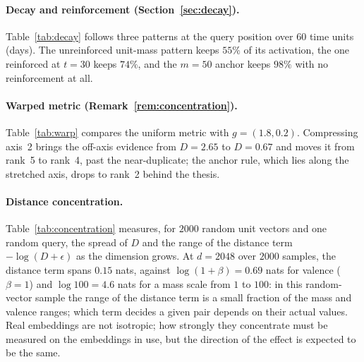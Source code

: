 \documentclass[11pt]{article}
\theoremstyle{remark}
\newcommand{\act}{E}
\begin{document}
\paragraph{Decay and reinforcement (Section~\ref{sec:decay}).}
Table~\ref{tab:decay} follows three patterns at the query position over $60$ time units (days). The unreinforced unit-mass pattern keeps $55\%$ of its activation, the one reinforced at $t=30$ keeps $74\%$, and the $m=50$ anchor keeps $98\%$ with no reinforcement at all.

\begin{table}[htbp]
  \centering
  \caption{Decay over $60$ time units (days) with $\lambda_0=0.02\text{ days}^{-1}$, $m_\ast=1$.}
  \label{tab:decay}
  
\end{table}

\paragraph{Warped metric (Remark~\ref{rem:concentration}).}
Table~\ref{tab:warp} compares the uniform metric with $g=(1.8,0.2)$. Compressing axis~2 brings the off-axis evidence from $D=2.65$ to $D=0.67$ and moves it from rank~5 to rank~4, past the near-duplicate; the anchor rule, which lies along the stretched axis, drops to rank~2 behind the thesis.

\begin{table}[htbp]
  \centering
  \caption{Warped distances and active-set ranks (by $|\act|$) for the toy scene under the uniform and the warped metric.}
  \label{tab:warp}
  
\end{table}

\paragraph{Distance concentration.}
Table~\ref{tab:concentration} measures, for $2000$ random unit vectors and one random query, the spread of $D$ and the range of the distance term $-\log(D+\epsilon)$ as the dimension grows. At $d=2048$ over $2000$ samples, the distance term spans $0.15$ nats, against $\log(1+\beta)=0.69$ nats for valence ($\beta=1$) and $\log 100 = 4.6$ nats for a mass scale from $1$ to $100$: in this random-vector sample the range of the distance term is a small fraction of the mass and valence ranges; which term decides a given pair depends on their actual values. Real embeddings are not isotropic; how strongly they concentrate must be measured on the embeddings in use, but the direction of the effect is expected to be the same.
\end{document}
